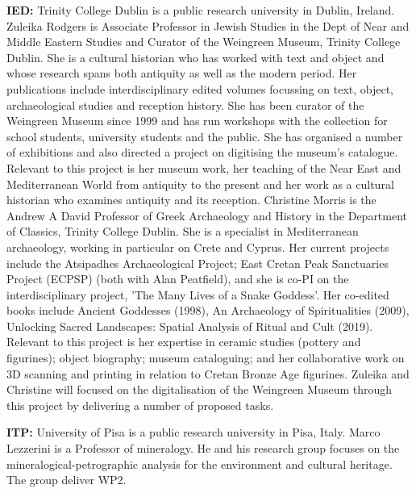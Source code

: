\item \textbf{IED:} Trinity College Dublin is a public research university in Dublin, Ireland. Zuleika Rodgers is Associate Professor in Jewish Studies in the Dept of Near and Middle Eastern Studies and Curator of the Weingreen Museum, Trinity College Dublin. She is a cultural historian who has worked with text and object and whose research spans both antiquity as well as the modern period. Her publications include interdisciplinary edited volumes focussing on text, object, archaeological studies and reception history.  She has been curator of the Weingreen Museum since 1999 and has run workshops with the collection for school students, university students and the public. She has organised a number of exhibitions and also directed a project on digitising the museum’s catalogue. Relevant to this project is her museum work, her teaching of the Near East and Mediterranean World from antiquity to the present and her work as a cultural historian who examines antiquity and its reception. Christine Morris is the Andrew A David Professor of Greek Archaeology and History in the Department of Classics, Trinity College Dublin. She is a specialist in Mediterranean archaeology, working in particular on Crete and Cyprus. Her current projects include the Atsipadhes Archaeological Project; East Cretan Peak Sanctuaries Project (ECPSP) (both with Alan Peatfield), and she is co-PI on the interdisciplinary project, 'The Many Lives of a Snake Goddess'. Her co-edited books include Ancient Goddesses (1998), An Archaeology of Spiritualities (2009), Unlocking Sacred Landscapes: Spatial Analysis of Ritual and Cult (2019).  Relevant to this project is her expertise in ceramic studies (pottery and figurines); object biography; museum cataloguing; and her collaborative work on 3D scanning and printing in relation to Cretan Bronze Age figurines. Zuleika and Christine will focused on the digitalisation of the Weingreen Museum through this project by delivering a number of proposed tasks.

\item \textbf{ITP:} University of Pisa is a public research university in Pisa, Italy. Marco Lezzerini is a Professor of mineralogy. He and his research group focuses on the mineralogical-petrographic analysis for the environment and cultural heritage. The group deliver WP2.

